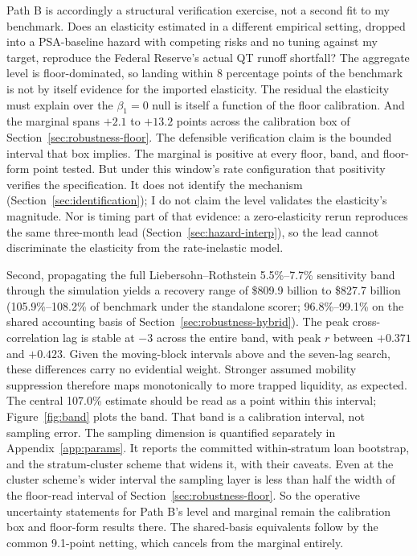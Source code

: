 \documentclass[12pt]{article}
\begin{document}
Path B is accordingly a structural verification exercise, not a second fit to my benchmark. Does an elasticity estimated in a different empirical setting, dropped into a PSA-baseline hazard with competing risks and no tuning against my target, reproduce the Federal Reserve's actual QT runoff shortfall? The aggregate level is floor-dominated, so landing within 8 percentage points of the benchmark is not by itself evidence for the imported elasticity. The residual the elasticity must explain over the $\beta_1 = 0$ null is itself a function of the floor calibration. And the marginal spans $+2.1$ to $+13.2$ points across the calibration box of Section~\ref{sec:robustness-floor}. The defensible verification claim is the bounded interval that box implies. The marginal is positive at every floor, band, and floor-form point tested. But under this window's rate configuration that positivity verifies the specification. It does not identify the mechanism (Section~\ref{sec:identification}); I do not claim the level validates the elasticity's magnitude. Nor is timing part of that evidence: a zero-elasticity rerun reproduces the same three-month lead (Section~\ref{sec:hazard-interp}), so the lead cannot discriminate the elasticity from the rate-inelastic model.

Second, propagating the full Liebersohn--Rothstein 5.5\%--7.7\% sensitivity band through the simulation yields a recovery range of \$809.9 billion to \$827.7 billion (105.9\%--108.2\% of benchmark under the standalone scorer; 96.8\%--99.1\% on the shared accounting basis of Section~\ref{sec:robustness-hybrid}). The peak cross-correlation lag is stable at $-3$ across the entire band, with peak $r$ between $+0.371$ and $+0.423$. Given the moving-block intervals above and the seven-lag search, these differences carry no evidential weight. Stronger assumed mobility suppression therefore maps monotonically to more trapped liquidity, as expected. The central 107.0\% estimate should be read as a point within this interval; Figure~\ref{fig:band} plots the band. That band is a calibration interval, not sampling error. The sampling dimension is quantified separately in Appendix~\ref{app:params}. It reports the committed within-stratum loan bootstrap, and the stratum-cluster scheme that widens it, with their caveats. Even at the cluster scheme's wider interval the sampling layer is less than half the width of the floor-read interval of Section~\ref{sec:robustness-floor}. So the operative uncertainty statements for Path B's level and marginal remain the calibration box and floor-form results there. The shared-basis equivalents follow by the common 9.1-point netting, which cancels from the marginal entirely.
\end{document}
